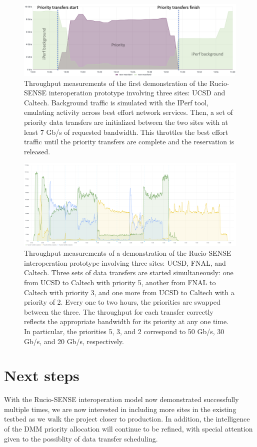 \begin{figure}[htb]
  \centering
  \includegraphics[width=.9\textwidth]{fig/cyber/rucio-sense_demo.png}
  \caption{
      Throughput measurements of the first demonstration of the Rucio-SENSE interoperation prototype involving three sites: UCSD and Caltech. 
      Background traffic is simulated with the IPerf tool, emulating activity across best effort network services. 
      Then, a set of priority data transfers are initialized between the two sites with at least 7 Gb/s of requested bandwidth. 
      This throttles the best effort traffic until the priority transfers are complete and the reservation is released. 
  }
  \label{fig:rucio_sense_demo}
\end{figure}

\begin{figure}[htb]
  \centering
  \includegraphics[width=.9\textwidth]{fig/cyber/rucio-sense_demo_big.png}
  \caption{
      Throughput measurements of a demonstration of the Rucio-SENSE interoperation prototype involving three sites: UCSD, FNAL, and Caltech. 
      Three sets of data transfers are started simultaneously: one from UCSD to Caltech with priority 5, another from FNAL to Caltech with priority 3, and one more from UCSD to Caltech with a priority of 2. 
      Every one to two hours, the priorities are swapped between the three. 
      The throughput for each transfer correctly reflects the appropriate bandwidth for its priority at any one time. 
      In particular, the priorities 5, 3, and 2 correspond to 50 Gb/s, 30 Gb/s, and 20 Gb/s, respectively.
    }
  \label{fig:rucio_sense_demo_big}
\end{figure}

\section{Next steps}
With the Rucio-SENSE interoperation model now demonstrated successfully multiple times, we are now interested in including more sites in the existing testbed as we walk the project closer to production. 
In addition, the intelligence of the DMM priority allocation will continue to be refined, with special attention given to the possiblity of data transfer scheduling. 
